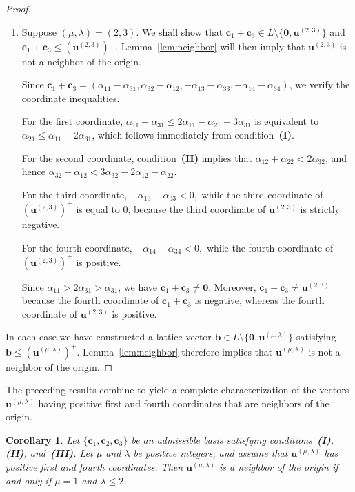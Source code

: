 \documentclass[12pt,a4paper]{amsart}
\newtheorem{corollary}[theorem]{Corollary}
\theoremstyle{definition}
\begin{document}
\begin{proof}
\begin{enumerate}
\item[\textbf{Case 2.}]
Suppose $(\mu,\lambda)=(2,3)$. We shall show that
$\mathbf c_1+\mathbf c_3
\in L\setminus\{\mathbf0,\mathbf u^{(2,3)}\}$ and
$\mathbf c_1+\mathbf c_3
\le(\mathbf u^{(2,3)})^+$.
Lemma~\ref{lem:neighbor} will then imply that
$\mathbf u^{(2,3)}$ is not a neighbor of the origin.

Since
$\mathbf c_1+\mathbf c_3
=
(\alpha_{11}-\alpha_{31},
\alpha_{32}-\alpha_{12},
-\alpha_{13}-\alpha_{33},
-\alpha_{14}-\alpha_{34})$,
we verify the coordinate inequalities.

For the first coordinate,
$\alpha_{11}-\alpha_{31}
\le
2\alpha_{11}-\alpha_{21}-3\alpha_{31}$
is equivalent to
$\alpha_{21}\le\alpha_{11}-2\alpha_{31}$,
which follows immediately from
condition~\textup{\textbf{(I)}}.

For the second coordinate, condition~\textup{\textbf{(II)}} implies that
$\alpha_{12}+\alpha_{22}<2\alpha_{32}$, and hence
$
\alpha_{32}-\alpha_{12}
<
3\alpha_{32}-2\alpha_{12}-\alpha_{22}.$

For the third coordinate,
$
-\alpha_{13}-\alpha_{33}<0,$
while the third coordinate of $(\mathbf u^{(2,3)})^+$ is equal to $0$,
because the third coordinate of $\mathbf u^{(2,3)}$ is strictly
negative.

For the fourth coordinate, $
-\alpha_{14}-\alpha_{34}<0,$
while the fourth coordinate of $(\mathbf u^{(2,3)})^+$ is positive.

Since
$\alpha_{11}>2\alpha_{31}>\alpha_{31}$,
we have
$\mathbf c_1+\mathbf c_3\neq\mathbf0$.
Moreover,
$\mathbf c_1+\mathbf c_3\neq\mathbf u^{(2,3)}$
because the fourth coordinate of
$\mathbf c_1+\mathbf c_3$
is negative,
whereas the fourth coordinate of
$\mathbf u^{(2,3)}$
is positive.
\end{enumerate}

In each case we have constructed a lattice vector
$\mathbf b\in L\setminus\{\mathbf0,\mathbf u^{(\mu,\lambda)}\}$
satisfying
$\mathbf b\le(\mathbf u^{(\mu,\lambda)})^+$.
Lemma~\ref{lem:neighbor} therefore implies that
$\mathbf u^{(\mu,\lambda)}$
is not a neighbor of the origin.
\end{proof}

The preceding results combine to yield a complete characterization of
the vectors $\mathbf u^{(\mu,\lambda)}$ having positive first and
fourth coordinates that are neighbors of the origin.

\begin{corollary}\label{cor:classification}
Let $\{\mathbf c_1,\mathbf c_2,\mathbf c_3\}$ be an admissible basis
satisfying conditions~\textup{\textbf{(I)}},
\textup{\textbf{(II)}}, and~\textup{\textbf{(III)}}.
Let $\mu$ and $\lambda$ be positive integers, and assume that
$\mathbf u^{(\mu,\lambda)}$ has positive first and fourth
coordinates. Then $\mathbf u^{(\mu,\lambda)}$ is a neighbor of the
origin if and only if
$\mu=1$ and 
$\lambda\le2$.
\end{corollary}
\end{document}
